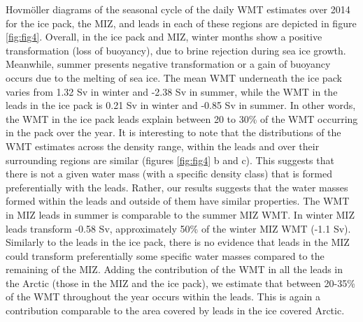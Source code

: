 \documentclass[lineno,sn-basic]{sn-jnl}%
\begin{document}
Hovm\"oller diagrams of the seasonal cycle of the daily WMT estimates over 2014 for the ice pack, the MIZ, and leads in each of these regions are depicted in figure \ref{fig:fig4}.
Overall, in the ice pack and MIZ, winter months show a positive transformation (loss of buoyancy), due to brine rejection during sea ice growth. Meanwhile, summer presents negative transformation or a gain of buoyancy occurs due to the melting of sea ice.  
The mean WMT underneath the ice pack varies from 1.32 Sv in winter and -2.38 Sv in summer, while the WMT in the leads in the ice pack is 0.21 Sv in winter and -0.85 Sv in summer. In other words, the WMT in the ice pack leads explain between 20 to 30\% of the WMT occurring in the pack over the year. It is interesting to note that the distributions of the WMT estimates across the density range, within the leads and over their surrounding regions are similar (figures \ref{fig:fig4} b and c). This suggests that there is not a given water mass (with a specific density class) that is formed preferentially with the leads. Rather, our results suggests that the water masses formed within the leads and outside of them have similar properties. 
The WMT in MIZ leads in summer is comparable to the summer MIZ WMT. In winter MIZ leads transform -0.58 Sv, approximately 50\% of the winter MIZ WMT (-1.1 Sv). Similarly to the leads in the ice pack, there is no evidence that leads in the MIZ could transform preferentially some specific water masses compared to the remaining of the MIZ. 
Adding the contribution of the WMT in all the leads in the Arctic (those in the MIZ and the ice pack), we estimate that between 20-35\% of the WMT throughout the year occurs within the leads. This is again a contribution comparable to the area covered by leads in the ice covered Arctic. 
\end{document}
